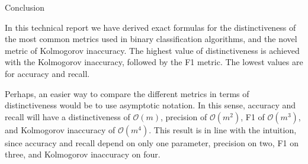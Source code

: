 Conclusion

In this technical report we have derived exact formulas for the distinctiveness of the most common metrics used in binary classification algorithms, and the novel metric of Kolmogorov inaccuracy. The highest value of distinctiveness is achieved with the Kolmogorov inaccuracy, followed by the F1 metric. The lowest values are for accuracy and recall.

Perhaps, an easier way to compare the different metrics in terms of distinctiveness would be to use asymptotic notation. In this sense, accuracy and recall will have a distinctiveness of $\mathcal{O}\left(m\right)$, precision of $\mathcal{O}\left(m^{2}\right)$, F1 of $\mathcal{O}\left(m^{3}\right)$, and Kolmogorov inaccuracy of $\mathcal{O}\left(m^{4}\right)$. This result is in line with the intuition, since accuracy and recall depend on only one parameter, precision on two, F1 on three, and Kolmogorov inaccuracy on four.
